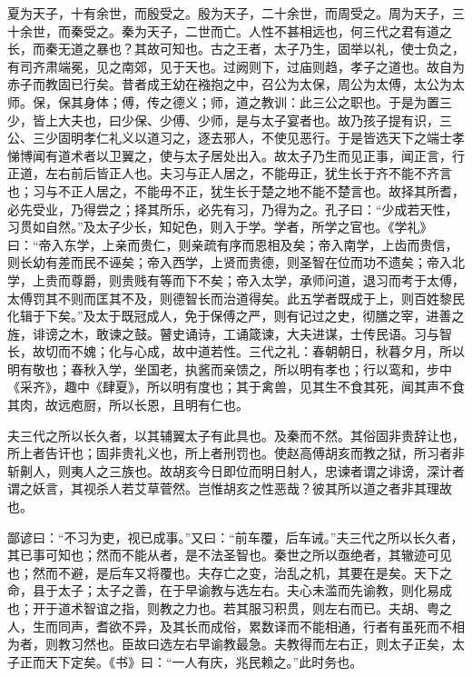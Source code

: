 \documentclass[UTF8,titlepage,oneside]{ctexbook}
\begin{document}
夏为天子，十有余世，而殷受之。殷为天子，二十余世，而周受之。周为天子，三十余世，而秦受之。秦为天子，二世而亡。人性不甚相远也，何三代之君有道之长，而秦无道之暴也？其故可知也。古之王者，太子乃生，固举以礼，使士负之，有司齐肃端冕，见之南郊，见于天也。过阙则下，过庙则趋，孝子之道也。故自为赤子而教固已行矣。昔者成王幼在襁抱之中，召公为太保，周公为太傅，太公为太师。保，保其身体；傅，传之德义；师，道之教训：此三公之职也。于是为置三少，皆上大夫也，曰少保、少傅、少师，是与太子宴者也。故乃孩子提有识，三公、三少固明孝仁礼义以道习之，逐去邪人，不使见恶行。于是皆选天下之端士孝悌博闻有道术者以卫翼之，使与太子居处出入。故太子乃生而见正事，闻正言，行正道，左右前后皆正人也。夫习与正人居之，不能毋正，犹生长于齐不能不齐言也；习与不正人居之，不能毋不正，犹生长于楚之地不能不楚言也。故择其所耆，必先受业，乃得尝之；择其所乐，必先有习，乃得为之。孔子曰：“少成若天性，习贯如自然。”及太子少长，知妃色，则入于学。学者，所学之官也。《学礼》曰：“帝入东学，上亲而贵仁，则亲疏有序而恩相及矣；帝入南学，上齿而贵信，则长幼有差而民不诬矣；帝入西学，上贤而贵德，则圣智在位而功不遗矣；帝入北学，上贵而尊爵，则贵贱有等而下不矣；帝入太学，承师问道，退习而考于太傅，太傅罚其不则而匡其不及，则德智长而治道得矣。此五学者既成于上，则百姓黎民化辑于下矣。”及太于既冠成人，免于保傅之严，则有记过之史，彻膳之宰，进善之旌，诽谤之木，敢谏之鼓。瞽史诵诗，工诵箴谏，大夫进谋，士传民语。习与智长，故切而不媿；化与心成，故中道若性。三代之礼：春朝朝日，秋暮夕月，所以明有敬也；春秋入学，坐国老，执酱而亲馈之，所以明有孝也；行以鸾和，步中《采齐》，趣中《肆夏》，所以明有度也；其于禽兽，见其生不食其死，闻其声不食其肉，故远庖厨，所以长恩，且明有仁也。


夫三代之所以长久者，以其辅翼太子有此具也。及秦而不然。其俗固非贵辞让也，所上者告讦也；固非贵礼义也，所上者刑罚也。使赵高傅胡亥而教之狱，所习者非斩劓人，则夷人之三族也。故胡亥今日即位而明日射人，忠谏者谓之诽谤，深计者谓之妖言，其视杀人若艾草菅然。岂惟胡亥之性恶哉？彼其所以道之者非其理故也。


鄙谚曰：“不习为吏，视已成事。”又曰：“前车覆，后车诫。”夫三代之所以长久者，其已事可知也；然而不能从者，是不法圣智也。秦世之所以亟绝者，其辙迹可见也；然而不避，是后车又将覆也。夫存亡之变，治乱之机，其要在是矣。天下之命，县于太子；太子之善，在于早谕教与选左右。夫心未滥而先谕教，则化易成也；开于道术智谊之指，则教之力也。若其服习积贯，则左右而已。夫胡、粤之人，生而同声，耆欲不异，及其长而成俗，累数译而不能相通，行者有虽死而不相为者，则教习然也。臣故曰选左右早谕教最急。夫教得而左右正，则太子正矣，太子正而天下定矣。《书》曰：“一人有庆，兆民赖之。”此时务也。
\end{document}
